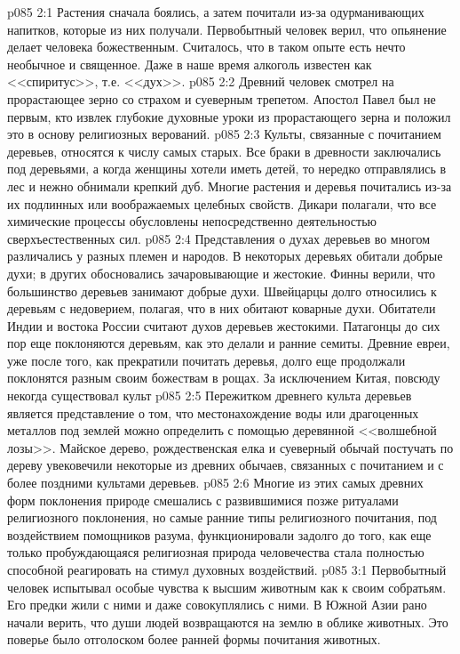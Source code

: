 \vs p085 2:1 Растения сначала боялись, а затем почитали из\hyp{}за одурманивающих напитков, которые из них получали. Первобытный человек верил, что опьянение делает человека божественным. Считалось, что в таком опыте есть нечто необычное и священное. Даже в наше время алкоголь известен как <<спиритус>>, т.е. <<дух>>.
\vs p085 2:2 Древний человек смотрел на прорастающее зерно со страхом и суеверным трепетом. Апостол Павел был не первым, кто извлек глубокие духовные уроки из прорастающего зерна и положил это в основу религиозных верований.
\vs p085 2:3 Культы, связанные с почитанием деревьев, относятся к числу самых старых. Все браки в древности заключались под деревьями, а когда женщины хотели иметь детей, то нередко отправлялись в лес и нежно обнимали крепкий дуб. Многие растения и деревья почитались из\hyp{}за их подлинных или воображаемых целебных свойств. Дикари полагали, что все химические процессы обусловлены непосредственно деятельностью сверхъестественных сил.
\vs p085 2:4 Представления о духах деревьев во многом различались у разных племен и народов. В некоторых деревьях обитали добрые духи; в других обосновались зачаровывающие и жестокие. Финны верили, что большинство деревьев занимают добрые духи. Швейцарцы долго относились к деревьям с недоверием, полагая, что в них обитают коварные духи. Обитатели Индии и востока России считают духов деревьев жестокими. Патагонцы до сих пор еще поклоняются деревьям, как это делали и ранние семиты. Древние евреи, уже после того, как прекратили почитать деревья, долго еще продолжали поклонятся разным своим божествам в рощах. За исключением Китая, повсюду некогда существовал культ 
\vs p085 2:5 Пережитком древнего культа деревьев является представление о том, что местонахождение воды или драгоценных металлов под землей можно определить с помощью деревянной <<волшебной лозы>>. Майское дерево, рождественская елка и суеверный обычай постучать по дереву увековечили некоторые из древних обычаев, связанных с почитанием и с более поздними культами деревьев.
\vs p085 2:6 Многие из этих самых древних форм поклонения природе смешались с развившимися позже ритуалами религиозного поклонения, но самые ранние типы религиозного почитания, под воздействием помощников разума, функционировали задолго до того, как еще только пробуждающаяся религиозная природа человечества стала полностью способной реагировать на стимул духовных воздействий.
\vs p085 3:1 Первобытный человек испытывал особые чувства к высшим животным как к своим собратьям. Его предки жили с ними и даже совокуплялись с ними. В Южной Азии рано начали верить, что души людей возвращаются на землю в облике животных. Это поверье было отголоском более ранней формы почитания животных.
